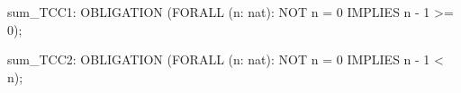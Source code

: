 sum_TCC1: OBLIGATION (FORALL (n: nat): NOT n = 0 IMPLIES n - 1 >= 0);

sum_TCC2: OBLIGATION (FORALL (n: nat): NOT n = 0 IMPLIES n - 1 < n);